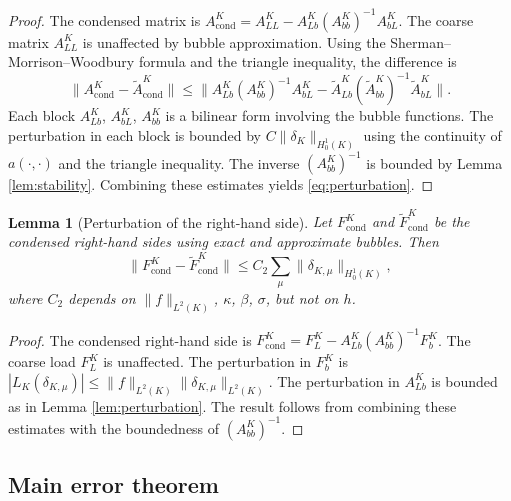 \documentclass[11pt]{article}
\newtheorem{lemma}[theorem]{Lemma}
\theoremstyle{remark}
\begin{document}
\begin{proof}
The condensed matrix is $A_{\mathrm{cond}}^K = A_{LL}^K - A_{Lb}^K (A_{bb}^K)^{-1} A_{bL}^K$. The coarse matrix $A_{LL}^K$ is unaffected by bubble approximation. Using the Sherman--Morrison--Woodbury formula and the triangle inequality, the difference is
\begin{equation}
\|A_{\mathrm{cond}}^K - \widetilde{A}_{\mathrm{cond}}^K\| \leq \|A_{Lb}^K (A_{bb}^K)^{-1} A_{bL}^K - \widetilde{A}_{Lb}^K (\widetilde{A}_{bb}^K)^{-1} \widetilde{A}_{bL}^K\|.
\end{equation}
Each block $A_{Lb}^K$, $A_{bL}^K$, $A_{bb}^K$ is a bilinear form involving the bubble functions. The perturbation in each block is bounded by $C\|\delta_K\|_{H^1_0(K)}$ using the continuity of $a(\cdot,\cdot)$ and the triangle inequality. The inverse $(A_{bb}^K)^{-1}$ is bounded by Lemma \ref{lem:stability}. Combining these estimates yields \eqref{eq:perturbation}.
\end{proof}

\begin{lemma}[Perturbation of the right-hand side]
\label{lem:rhs_perturbation}
Let $F_{\mathrm{cond}}^K$ and $\widetilde{F}_{\mathrm{cond}}^K$ be the condensed right-hand sides using exact and approximate bubbles. Then
\begin{equation}\label{eq:rhs_pert}
\|F_{\mathrm{cond}}^K - \widetilde{F}_{\mathrm{cond}}^K\| \leq C_2\sum_{\mu} \|\delta_{K,\mu}\|_{H^1_0(K)},
\end{equation}
where $C_2$ depends on $\|f\|_{L^2(K)}$, $\kappa$, $\beta$, $\sigma$, but not on $h$.
\end{lemma}

\begin{proof}
The condensed right-hand side is $F_{\mathrm{cond}}^K = F_L^K - A_{Lb}^K (A_{bb}^K)^{-1} F_b^K$. The coarse load $F_L^K$ is unaffected. The perturbation in $F_b^K$ is $|L_K(\delta_{K,\mu})| \leq \|f\|_{L^2(K)}\|\delta_{K,\mu}\|_{L^2(K)}$. The perturbation in $A_{Lb}^K$ is bounded as in Lemma \ref{lem:perturbation}. The result follows from combining these estimates with the boundedness of $(A_{bb}^K)^{-1}$.
\end{proof}

\subsection{Main error theorem}
\end{document}
